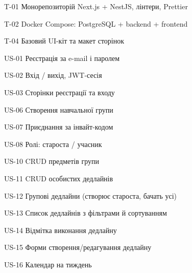 \item T-01 Монорепозиторій Next.js + NestJS, лінтери, Prettier
\item T-02 Docker Compose: PostgreSQL + backend + frontend
\item T-04 Базовий UI-кіт та макет сторінок
\item US-01 Реєстрація за e-mail і паролем
\item US-02 Вхід / вихід, JWT-сесія
\item US-03 Сторінки реєстрації та входу
\item US-06 Створення навчальної групи
\item US-07 Приєднання за інвайт-кодом
\item US-08 Ролі: староста / учасник
\item US-10 CRUD предметів групи
\item US-11 CRUD особистих дедлайнів
\item US-12 Групові дедлайни (створює староста, бачать усі)
\item US-13 Список дедлайнів з фільтрами й сортуванням
\item US-14 Відмітка виконання дедлайну
\item US-15 Форми створення/редагування дедлайну
\item US-16 Календар на тиждень